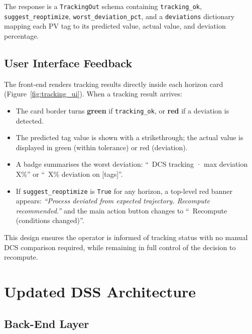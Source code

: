 The response is a \texttt{TrackingOut} schema containing
\texttt{tracking\_ok}, \texttt{suggest\_reoptimize},
\texttt{worst\_deviation\_pct}, and a \texttt{deviations} dictionary
mapping each PV tag to its predicted value, actual value, and deviation
percentage.

\subsection{User Interface Feedback}

The front-end renders tracking results directly inside each horizon card
(Figure~\ref{fig:tracking_ui}).  When a tracking result arrives:

\begin{itemize}
  \item The card border turns \textbf{green} if \texttt{tracking\_ok},
        or \textbf{red} if a deviation is detected.
  \item The predicted tag value is shown with a strikethrough; the actual
        value is displayed in green (within tolerance) or red (deviation).
  \item A badge summarises the worst deviation:
        ``\checkmark\ DCS tracking · max deviation X\%'' or
        ``\warning\ X\% deviation on [tags]''.
  \item If \texttt{suggest\_reoptimize} is \texttt{True} for any horizon,
        a top-level red banner appears: \textit{``Process deviated from
        expected trajectory. Recompute recommended.''} and the main
        action button changes to ``\warning\ Recompute (conditions changed)''.
\end{itemize}

This design ensures the operator is informed of tracking status with no
manual DCS comparison required, while remaining in full control of the
decision to recompute.

\section{Updated DSS Architecture}
\label{sec:architecture_updated}

\subsection{Back-End Layer}

